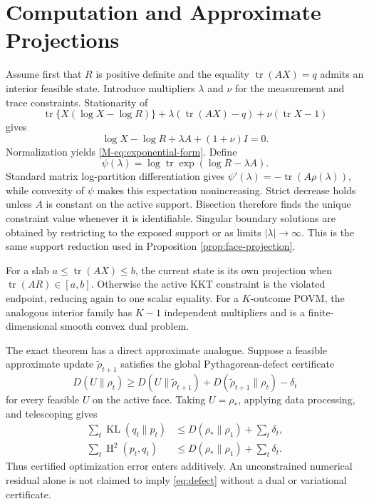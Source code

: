 \documentclass[twoside]{article}
\newcommand{\tr}{\operatorname{tr}}
\newcommand{\KL}{\operatorname{KL}}
\newcommand{\Hsq}{\operatorname{H}^2}
\begin{document}
\section{Computation and Approximate Projections}
\label{app:computation}

Assume first that $R$ is positive definite and the equality $\tr(AX)=q$ admits an interior feasible state. Introduce multipliers $\lambda$ and $\nu$ for the measurement and trace constraints. Stationarity of
\begin{equation}
\tr\{X(\log X-\log R)\}+\lambda(\tr(AX)-q)+\nu(\tr X-1)
\end{equation}
gives
\begin{equation}
\log X-\log R+\lambda A+(1+\nu)I=0.
\end{equation}
Normalization yields \eqref{M-eq:exponential-form}. Define
\begin{equation}
\psi(\lambda)=\log\tr\exp(\log R-\lambda A).
\end{equation}
Standard matrix log-partition differentiation gives $\psi'(\lambda)=-\tr(A\rho(\lambda))$, while convexity of $\psi$ makes this expectation nonincreasing. Strict decrease holds unless $A$ is constant on the active support. Bisection therefore finds the unique constraint value whenever it is identifiable. Singular boundary solutions are obtained by restricting to the exposed support or as limits $|\lambda|\to\infty$. This is the same support reduction used in Proposition \ref{prop:face-projection}.

For a slab $a\leq\tr(AX)\leq b$, the current state is its own projection when $\tr(AR)\in[a,b]$. Otherwise the active KKT constraint is the violated endpoint, reducing again to one scalar equality. For a $K$-outcome POVM, the analogous interior family has $K-1$ independent multipliers and is a finite-dimensional smooth convex dual problem.

The exact theorem has a direct approximate analogue. Suppose a feasible approximate update $\widetilde\rho_{t+1}$ satisfies the global Pythagorean-defect certificate
\begin{equation}
D(U\|\rho_t)\geq D(U\|\widetilde\rho_{t+1})
+D(\widetilde\rho_{t+1}\|\rho_t)-\delta_t
\label{eq:defect}
\end{equation}
for every feasible $U$ on the active face. Taking $U=\rho_*$, applying data processing, and telescoping gives
\begin{align}
\sum_t\KL(q_t\|p_t)&\leq D(\rho_*\|\rho_1)+\sum_t\delta_t,\\
\sum_t\Hsq(p_t,q_t)&\leq D(\rho_*\|\rho_1)+\sum_t\delta_t.
\end{align}
Thus certified optimization error enters additively. An unconstrained numerical residual alone is not claimed to imply \eqref{eq:defect} without a dual or variational certificate.
\end{document}
